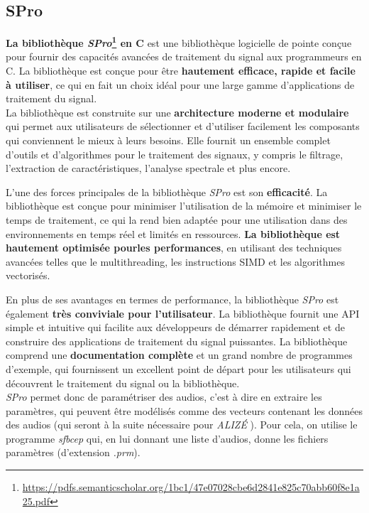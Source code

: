 \subsection{SPro}
\label{subsec:SPro}

\textbf{La bibliothèque \textit{SPro}\footnote{\url{https://pdfs.semanticscholar.org/1bc1/47e07028cbe6d2841e825c70abb60f8e1a25.pdf}} en C} est une bibliothèque logicielle de pointe conçue pour fournir des capacités avancées de traitement du signal
aux programmeurs en C. La bibliothèque est conçue pour être\textbf{ hautement efficace, rapide et facile à utiliser}, ce qui en fait un choix idéal
pour une large gamme d'applications de traitement du signal.\\

La bibliothèque est construite sur une \textbf{architecture moderne et modulaire} qui permet aux utilisateurs de sélectionner et d'utiliser facilement
les composants qui conviennent le mieux à leurs besoins. Elle fournit un ensemble complet d'outils et d'algorithmes pour le traitement des signaux,
y compris le filtrage, l'extraction de caractéristiques, l'analyse spectrale et plus encore.

L'une des forces principales de la bibliothèque \textit{SPro} est son \textbf{efficacité}. La bibliothèque est conçue pour minimiser l'utilisation de la
mémoire et minimiser le temps de traitement, ce qui la rend bien adaptée pour une utilisation dans des environnements en temps réel et limités en ressources.
\textbf{La bibliothèque est hautement optimisée pourles performances}, en utilisant des techniques avancées telles que le multithreading, les instructions SIMD
et les algorithmes vectorisés.

En plus de ses avantages en termes de performance, la bibliothèque \textit{SPro} est également \textbf{très conviviale pour l'utilisateur}. La bibliothèque
fournit une API simple et intuitive qui facilite aux développeurs de démarrer rapidement et de construire des applications de traitement du signal puissantes.
La bibliothèque comprend une \textbf{documentation complète} et un grand nombre de programmes d'exemple, qui fournissent un excellent point de départ pour les
utilisateurs qui découvrent le traitement du signal ou la bibliothèque.\\


\textit{ SPro} permet donc de paramétriser des audios, c'est à dire en extraire les paramètres, qui peuvent être modélisés comme des vecteurs contenant les
données des audios (qui seront à la suite nécessaire pour \textit{ALIZÉ} ).
Pour cela, on utilise le programme \textit{sfbcep} qui, en lui donnant une liste d'audios, donne les fichiers paramètres (d'extension \textit{.prm}).

